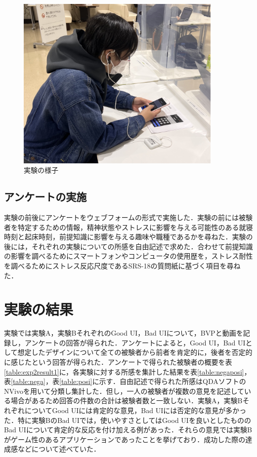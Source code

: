 \begin{figure}[htbp]
  \begin{minipage}{\hsize}
    \begin{center}
       \includegraphics[width=100mm]{img/experience.jpg}
    \end{center}
    \caption{実験の様子}
    \label{fig:observe}
  \end{minipage}
\end{figure}

\subsection{アンケートの実施}

実験の前後にアンケートをウェブフォームの形式で実施した．実験の前には被験者を特定するための情報，精神状態やストレスに影響を与える可能性のある就寝時刻と起床時刻，前提知識に影響を与える趣味や職種であるかを尋ねた．実験の後には，それぞれの実験についての所感を自由記述で求めた．合わせて前提知識の影響を調べるためにスマートフォンやコンピュータの使用歴を，ストレス耐性を調べるためにストレス反応尺度であるSRS-18\cite{stressquestionare}の質問紙に基づく項目を尋ねた．

\section{実験の結果}

実験では実験A，実験BそれぞれのGood UI，Bad UIについて，BVPと動画を記録し，アンケートの回答が得られた．アンケートによると，Good UI，Bad UIとして想定したデザインについて全ての被験者から前者を肯定的に，後者を否定的に感じたという回答が得られた．アンケートで得られた被験者の概要を表\ref{table:exp2result1}に，各実験に対する所感を集計した結果を表\ref{table:negaposi}，表\ref{table:nega}，表\ref{table:posi}に示す．自由記述で得られた所感はQDAソフトのNVivoを用いて分類し集計した．但し，一人の被験者が複数の意見を記述している場合があるため回答の件数の合計は被験者数と一致しない．実験A，実験BそれぞれについてGood UIには肯定的な意見，Bad UIには否定的な意見が多かった．特に実験BのBad UIでは，使いやすさとしてはGood UIを良いとしたもののBad UIについて肯定的な反応を付け加える例があった．それらの意見では実験Bがゲーム性のあるアプリケーションであったことを挙げており．成功した際の達成感などについて述べていた．

